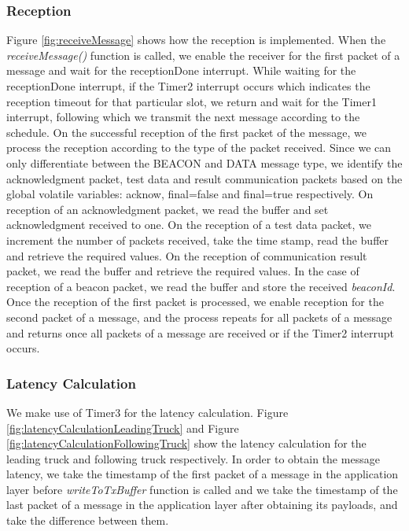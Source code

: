 \subsubsection{Reception}
Figure \ref{fig:receiveMessage} shows how the reception is implemented. When the \emph{receiveMessage()} function is called, we enable the receiver for the first packet of a message and wait for the receptionDone interrupt. While waiting for the receptionDone interrupt, if the Timer2 interrupt occurs which indicates the reception timeout for that particular slot, we return and wait for the Timer1 interrupt, following which we transmit the next message according to the schedule. On the successful reception of the first packet of the message, we process the reception according to the type of the packet received. Since we can only differentiate between the BEACON and DATA message type, we identify the acknowledgment packet, test data and result communication packets based on the global volatile variables: acknow, final=false and final=true respectively. On reception of an acknowledgment packet, we read the buffer and set acknowledgment received to one. On the reception of a test data packet, we increment the number of packets received, take the time stamp, read the buffer and retrieve the required values. On the reception of communication result packet, we read the buffer and retrieve the required values. In the case of reception of a beacon packet, we read the buffer and store the received \emph{beaconId}. Once the reception of the first packet is processed, we enable reception for the second packet of a message, and the process repeats for all packets of a message and returns once all packets of a message are received or if the Timer2 interrupt occurs.

\subsubsection{Latency Calculation}    
We make use of Timer3 for the latency calculation. Figure \ref{fig:latencyCalculationLeadingTruck} and Figure \ref{fig:latencyCalculationFollowingTruck} show the latency calculation for the leading truck and following truck respectively. In order to obtain the message latency, we take the timestamp of the first packet of a message in the application layer before \emph{writeToTxBuffer} function is called and we take the timestamp of the last packet of a message in the application layer after obtaining its payloads, and take the difference between them.

